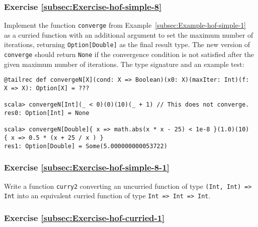 \subsubsection{Exercise \label{subsec:Exercise-hof-simple-8}\ref{subsec:Exercise-hof-simple-8}}

Implement the function \lstinline!converge! from Example~\ref{subsec:Example-hof-simple-1}
as a curried function with an additional argument to set the maximum
number of iterations, returning \lstinline!Option[Double]! as the
final result type. The new version of \lstinline!converge! should
return \lstinline!None! if the convergence condition is not satisfied
after the given maximum number of iterations. The type signature and
an example test:
\begin{lstlisting}
@tailrec def convergeN[X](cond: X => Boolean)(x0: X)(maxIter: Int)(f: X => X): Option[X] = ???

scala> convergeN[Int](_ < 0)(0)(10)(_ + 1) // This does not converge.
res0: Option[Int] = None

scala> convergeN[Double]{ x => math.abs(x * x - 25) < 1e-8 }(1.0)(10) { x => 0.5 * (x + 25 / x ) }
res1: Option[Double] = Some(5.000000000053722)
\end{lstlisting}
\begin{comment}
Solution:
\begin{lstlisting}
@tailrec def convergeN[X](p: X => Boolean)(x:X)(m:Int)(f: X => X): Option[X] =  {
              if (m <= 0) None
              else if (p(x)) Some(x) else converge(p)(f(x))(m-1)(f)             } // Defining as def convergeN[X]: (X => Boolean) => X => Int => (X => X) => Option[X] = ??? will break tail recursion!
\end{lstlisting}
\end{comment}


\subsubsection{Exercise \label{subsec:Exercise-hof-simple-8-1}\ref{subsec:Exercise-hof-simple-8-1}}

Write a function \lstinline!curry2! converting an uncurried function
of type \texttt{}\lstinline!(Int, Int) => Int! into an equivalent
curried function of type \texttt{}\lstinline!Int => Int => Int!.

\subsubsection{Exercise \label{subsec:Exercise-hof-curried-1}\ref{subsec:Exercise-hof-curried-1}}

